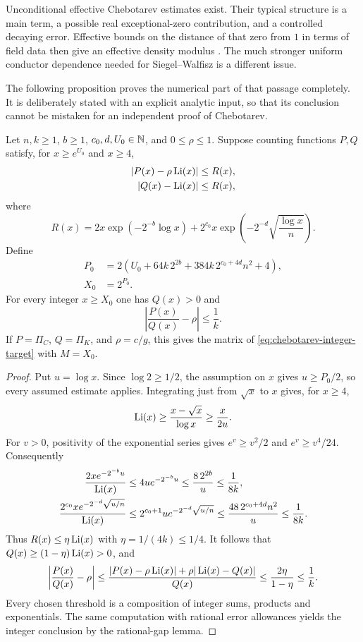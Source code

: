 Unconditional effective Chebotarev estimates exist. Their typical structure
is a main term, a possible real exceptional-zero contribution, and a
controlled decaying error. Effective bounds on the distance of that zero
from $1$ in terms of field data then give an effective density modulus
\cite{LagariasOdlyzko,ThornerZaman2019}. The much stronger uniform
conductor dependence needed for Siegel--Walfisz is a different issue.

The following proposition proves the numerical part of that passage
completely. It is deliberately stated with an explicit analytic input, so
that its conclusion cannot be mistaken for an independent proof of
Chebotarev.

\begin{proposition}
\label{prop:chebotarev-modulus}
Let $n,k\geq1$, $b\geq1$, $c_0,d,U_0\in\mathbb N$, and $0\leq\rho\leq1$.
Suppose counting functions $P,Q$ satisfy, for $x\geq e^{U_0}$ and $x\geq4$,
\begin{align*}
 |P(x)-\rho\operatorname{Li}(x)|&\leq R(x),\\
 |Q(x)-\operatorname{Li}(x)|&\leq R(x),
\end{align*}
where
\[
 R(x)=2x\exp(-2^{-b}\log x)
       +2^{c_0}x\exp\!\left(-2^{-d}\sqrt{\frac{\log x}{n}}\right).
\]
Define
\begin{align*}
 P_0&=2\left(U_0+64k\,2^{2b}
             +384k\,2^{c_0+4d}n^2+4\right),\\
 X_0&=2^{P_0}.
\end{align*}
For every integer $x\geq X_0$ one has $Q(x)>0$ and
\[
 \left|\frac{P(x)}{Q(x)}-\rho\right|\leq\frac1k.
\]
If $P=\Pi_C$, $Q=\Pi_K$, and $\rho=c/g$, this gives the matrix of
\eqref{eq:chebotarev-integer-target} with $M=X_0$.
\end{proposition}

\begin{proof}
Put $u=\log x$. Since $\log2\geq1/2$, the assumption on $x$ gives
$u\geq P_0/2$, so every assumed estimate applies. Integrating just from
$\sqrt x$ to $x$ gives, for $x\geq4$,
\[
 \operatorname{Li}(x)\geq\frac{x-\sqrt x}{\log x}\geq\frac{x}{2u}.
\]
For $v>0$, positivity of the exponential series gives
$e^v\geq v^2/2$ and $e^v\geq v^4/24$. Consequently
\begin{align*}
 \frac{2x e^{-2^{-b}u}}{\operatorname{Li}(x)}
 &\leq4u e^{-2^{-b}u}
 \leq\frac{8\,2^{2b}}u\leq\frac1{8k},\\
 \frac{2^{c_0}x e^{-2^{-d}\sqrt{u/n}}}{\operatorname{Li}(x)}
 &\leq 2^{c_0+1}u e^{-2^{-d}\sqrt{u/n}}
 \leq\frac{48\,2^{c_0+4d}n^2}u\leq\frac1{8k}.
\end{align*}
Thus $R(x)\leq\eta\operatorname{Li}(x)$ with $\eta=1/(4k)\leq1/4$.
It follows that $Q(x)\geq(1-\eta)\operatorname{Li}(x)>0$, and
\[
 \left|\frac{P(x)}{Q(x)}-\rho\right|
 \leq\frac{|P(x)-\rho\operatorname{Li}(x)|+\rho|\operatorname{Li}(x)-Q(x)|}{Q(x)}
 \leq\frac{2\eta}{1-\eta}\leq\frac1k.
\]
Every chosen threshold is a composition of integer sums, products and
exponentials. The same computation with rational error allowances yields
the integer conclusion by the rational-gap lemma.
\end{proof}

